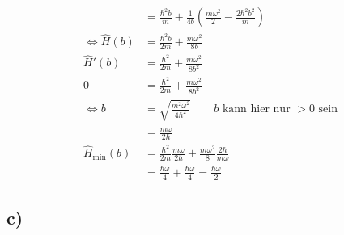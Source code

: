 \begin{align*}
        &= \frac{\hbar^2 b}{m} + \frac{1}{4b} \left( \frac{m\omega^2}{2} - \frac{2\hbar^2 b^2}{m} \right)\\
        \Leftrightarrow\hat{H}(b) &= \frac{\hbar^2 b}{2m} + \frac{m\omega^2}{8b}\\
        \hat{H}'(b) &= \frac{\hbar^2}{2m} + \frac{m\omega^2}{8b^2}\\
        0 &= \frac{\hbar^2}{2m} + \frac{m\omega^2}{8b^2}\\
        \Leftrightarrow b &= \sqrt{ \frac{m^2 \omega^2}{4\hbar^2}} \qquad \text{$b$ kann hier nur $>0$ sein}\\
        &= \frac{m \omega}{2\hbar}\\
        \hat{H}_{\text{min}}(b) &= \frac{\hbar^2}{2m} \frac{m\omega}{2\hbar} + \frac{m\omega^2}{8} \frac{2\hbar}{m\omega}\\
        &= \frac{\hbar \omega}{4} + \frac{\hbar \omega}{4} = \frac{\hbar \omega}{2}
    \end{align*}

\subsection{c)}

